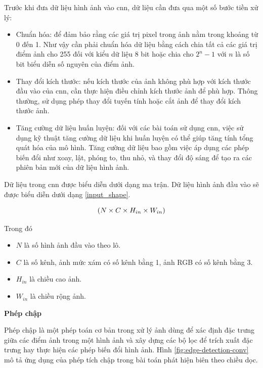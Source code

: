 Trước khi đưa dữ liệu hình ảnh vào \acrshort{cnn}, dữ liệu cần đưa qua một số bước tiền xử lý:

\begin{itemize}
	\item Chuẩn hóa: để đảm bảo rằng các giá trị pixel trong ảnh nằm trong khoảng từ 0 đến 1. Như vậy cần phải chuẩn hóa dữ liệu bằng cách chia tất cả các giá trị điểm ảnh cho 255 đối với kiểu dữ liệu 8 bit hoặc chia cho $2^n-1$ với $n$ là số bit biểu diễn số nguyên của điểm ảnh.
	\item Thay đổi kích thước: nếu kích thước của ảnh không phù hợp với kích thước đầu vào của \acrshort{cnn}, cần thực hiện điều chỉnh kích thước ảnh để phù hợp. Thông thường, sử dụng phép thay đổi tuyến tính hoặc cắt ảnh để thay đổi kích thước ảnh.
	\item Tăng cường dữ liệu huấn luyện: đối với các bài toán sử dụng \acrshort{cnn}, việc sử dụng kỹ thuật tăng cường dữ liệu khi huấn luyện có thể giúp tăng tính tổng quát hóa của mô hình. Tăng cường dữ liệu bao gồm việc áp dụng các phép biến đổi như xoay, lật, phóng to, thu nhỏ, và thay đổi độ sáng để tạo ra các phiên bản mới của dữ liệu hình ảnh.
\end{itemize}

Dữ liệu trong \acrshort{cnn} được biểu diễn dưới dạng ma trận. Dữ liệu hình ảnh đầu vào sẽ được biểu diễn dưới dạng \ref{input_shape}.

\begin{equation}
	\centering
	\label{input_shape}
	(N \times C \times H_{in} \times W_{in})
\end{equation}

Trong đó
\begin{itemize}
	\item $N$ là số hình ảnh đầu vào theo lô.
	\item $C$ là số kênh, ảnh mức xám có số kênh bằng 1, ảnh RGB có số kênh bằng 3.
	\item $H_{in}$ là chiều cao ảnh.
	\item $W_{in}$ là chiều rộng ảnh.
\end{itemize}

\textbf{Phép chập}

Phép chập là một phép toán cơ bản trong xử lý ảnh dùng để xác định đặc trưng giữa các điểm ảnh trong một hình ảnh và xây dựng các bộ lọc để trích xuất đặc trưng hay thực hiện các phép biến đổi hình ảnh. Hình \ref{fig:edge-detection-conv} mô tả ứng dụng của phép tích chập trong bài toán phát hiện biên theo chiều dọc.

